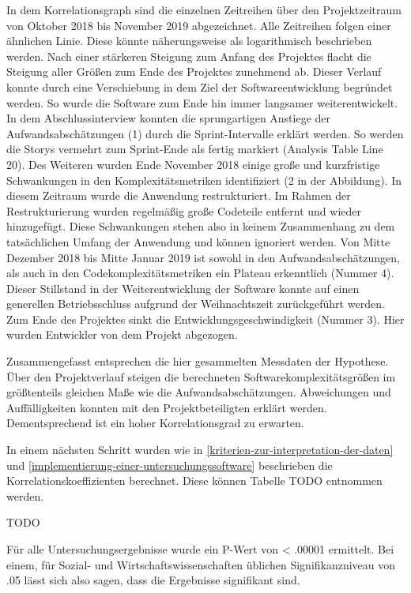 In dem Korrelationsgraph sind die einzelnen Zeitreihen über den
Projektzeitraum von Oktober 2018 bis November 2019 abgezeichnet. Alle
Zeitreihen folgen einer ähnlichen Linie. Diese könnte näherungsweise als
logarithmisch beschrieben werden. Nach einer stärkeren Steigung zum
Anfang des Projektes flacht die Steigung aller Größen zum Ende des
Projektes zunehmend ab. Dieser Verlauf konnte durch eine Verschiebung in
dem Ziel der Softwareentwicklung begründet werden. So wurde die Software
zum Ende hin immer langsamer weiterentwickelt. In dem Abschlussinterview
konnten die sprungartigen Anstiege der Aufwandsabschätzungen (1) durch
die Sprint-Intervalle erklärt werden. So werden die Storys vermehrt zum
Sprint-Ende als fertig markiert (Analysis Table Line 20). Des Weiteren
wurden Ende November 2018 einige große und kurzfristige Schwankungen in
den Komplexitätsmetriken identifiziert (2 in der Abbildung). In diesem
Zeitraum wurde die Anwendung restrukturiert. Im Rahmen der
Restrukturierung wurden regelmäßig große Codeteile entfernt und wieder
hinzugefügt. Diese Schwankungen stehen also in keinem Zusammenhang zu
dem tatsächlichen Umfang der Anwendung und können ignoriert werden. Von
Mitte Dezember 2018 bis Mitte Januar 2019 ist sowohl in den
Aufwandsabschätzungen, als auch in den Codekomplexitätsmetriken ein
Plateau erkenntlich (Nummer 4). Dieser Stillstand in der
Weiterentwicklung der Software konnte auf einen generellen
Betriebsschluss aufgrund der Weihnachtszeit zurückgeführt werden. Zum
Ende des Projektes sinkt die Entwicklungsgeschwindigkeit (Nummer 3).
Hier wurden Entwickler von dem Projekt abgezogen.

Zusammengefasst entsprechen die hier gesammelten Messdaten der
Hypothese. Über den Projektverlauf steigen die berechneten
Softwarekomplexitätsgrößen im größtenteils gleichen Maße wie die
Aufwandsabschätzungen. Abweichungen und Auffälligkeiten konnten mit den
Projektbeteiligten erklärt werden. Dementsprechend ist ein hoher
Korrelationsgrad zu erwarten.

In einem nächsten Schritt wurden wie in \ref{kriterien-zur-interpretation-der-daten} und \ref{implementierung-einer-untersuchungssoftware} beschrieben die
Korrelationskoeffizienten berechnet. Diese können Tabelle TODO entnommen
werden.

TODO

Für alle Untersuchungsergebnisse wurde ein P-Wert von \textless{} .00001
ermittelt.
Bei einem, für Sozial- und Wirtschaftswissenschaften üblichen
Signifikanzniveau von .05 lässt sich also sagen, dass die Ergebnisse
signifikant sind.

